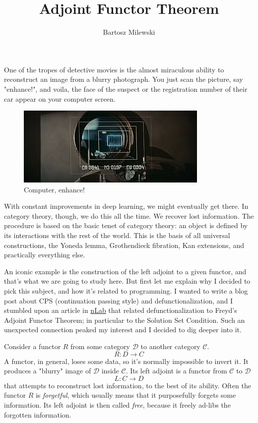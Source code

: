 \documentclass[11pt]{amsart}
\author{Bartosz Milewski}
\title{Adjoint Functor Theorem}
\begin{document}
\maketitle{}

One of the tropes of detective movies is the almost miraculous ability to reconstruct an image from a blurry photograph. You just scan the picture,  say "enhance!", and voila, the face of the suspect or the registration number of their car appear on your computer screen. 

\begin{figure}[h]
\includegraphics{BladeRunner.jpeg}
\caption{Computer, enhance!}
\end{figure}

With constant improvements in deep learning, we might eventually get there. In category theory, though, we do this all the time. We recover lost information. The procedure is based on the basic tenet of category theory: an object is defined by its interactions with the rest of the world. This is the basis of all universal constructions, the Yoneda lemma, Grothendieck fibration, Kan extensions, and practically everything else. 

An iconic example is the construction of the left adjoint to a given functor, and that's what we are going to study here. But first let me explain why I decided to pick this subject, and how it's related to programming. I wanted to write a blog post about CPS (continuation passing style) and defunctionalization, and I stumbled upon an article in \href{https://ncatlab.org/nlab/show/defunctionalization}{nLab} that related defunctionalization to Freyd's Adjoint Functor Theorem; in particular to the Solution Set Condition. Such an unexpected connection peaked my interest and I decided to dig deeper into it.

Consider a functor $R$ from some category $\mathcal D$ to another category $\mathcal C$. 
\[R \colon D \to C \]
A functor, in general, loses some data, so it's normally impossible to invert it. It produces a "blurry" image of $\mathcal D$ inside $\mathcal C$. Its left adjoint is a functor from $\mathcal C$ to $\mathcal D$ 
\[ L \colon C \to D\]
that attempts to reconstruct lost information, to the best of its ability. Often the functor $R$ is \emph{forgetful}, which usually means that it purposefully forgets some information. Its left adjoint is then called \emph{free}, because it freely ad-libs the forgotten information. 
\end{document}
